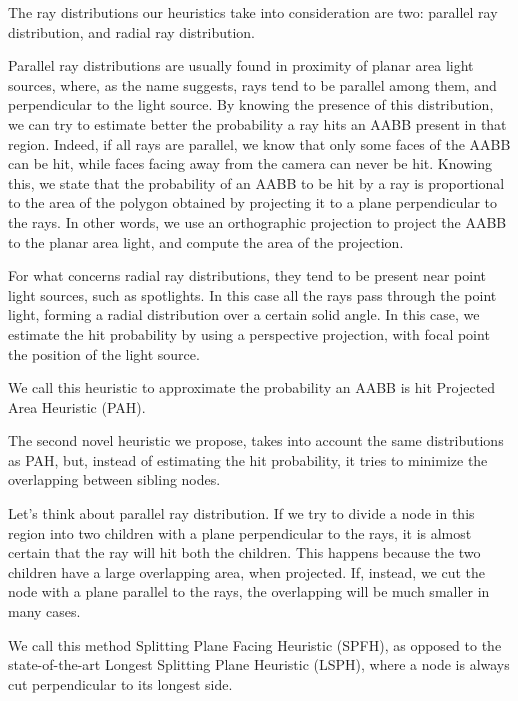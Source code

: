 \documentclass{PoliMi_MasterThesis}
\begin{document}
The ray distributions our heuristics take into consideration are two: parallel ray distribution, and radial ray distribution.

Parallel ray distributions are usually found in proximity of planar area light sources, where, as the name suggests, rays tend to be parallel among them, and perpendicular to the light source. By knowing the presence of this distribution, we can try to estimate better the probability a ray hits an AABB present in that region. Indeed, if all rays are parallel, we know that only some faces of the AABB can be hit, while faces facing away from the camera can never be hit. Knowing this, we state that the probability of an AABB to be hit by a ray is proportional to the area of the polygon obtained by projecting it to a plane perpendicular to the rays. In other words, we use an orthographic projection to project the AABB to the planar area light, and compute the area of the projection.

For what concerns radial ray distributions, they tend to be present near point light sources, such as spotlights. In this case all the rays pass through the point light, forming a radial distribution over a certain solid angle. In this case, we estimate the hit probability by using a perspective projection, with focal point the position of the light source.

We call this heuristic to approximate the probability an AABB is hit Projected Area Heuristic (PAH).

The second novel heuristic we propose, takes into account the same distributions as PAH, but, instead of estimating the hit probability, it tries to minimize the overlapping between sibling nodes.

Let's think about parallel ray distribution. If we try to divide a node in this region into two children with a plane perpendicular to the rays, it is almost certain that the ray will hit both the children. This happens because the two children have a large overlapping area, when projected. If, instead, we cut the node with a plane parallel to the rays, the overlapping will be much smaller in many cases.

We call this method Splitting Plane Facing Heuristic (SPFH), as opposed to the state-of-the-art Longest Splitting Plane Heuristic (LSPH), where a node is always cut perpendicular to its longest side.
\end{document}
